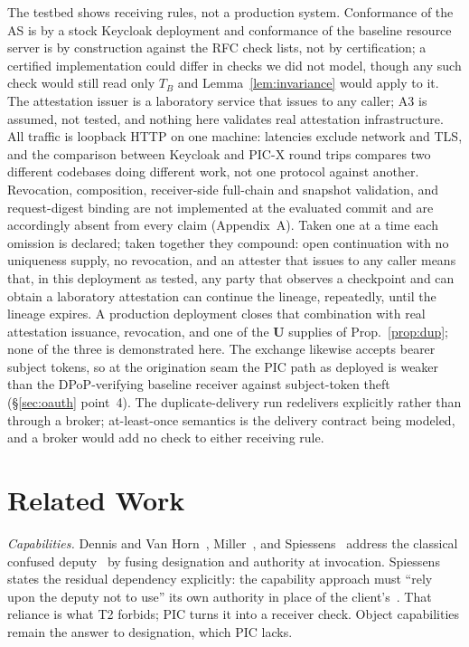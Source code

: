 \documentclass[conference]{IEEEtran}
\begin{document}
The testbed shows receiving rules, not a production system. Conformance of the AS is by a stock Keycloak deployment and conformance of the baseline resource server is by construction against the RFC check lists, not by certification; a certified implementation could differ in checks we did not model, though any such check would still read only $T_B$ and Lemma~\ref{lem:invariance} would apply to it. The attestation issuer is a laboratory service that issues to any caller; A3 is assumed, not tested, and nothing here validates real attestation infrastructure. All traffic is loopback HTTP on one machine: latencies exclude network and TLS, and the comparison between Keycloak and PIC-X round trips compares two different codebases doing different work, not one protocol against another. Revocation, composition, receiver-side full-chain and snapshot validation, and request-digest binding are not implemented at the evaluated commit and are accordingly absent from every claim (Appendix~A). Taken one at a time each omission is declared; taken together they compound: open continuation with no uniqueness supply, no revocation, and an attester that issues to any caller means that, in this deployment as tested, any party that observes a checkpoint and can obtain a laboratory attestation can continue the lineage, repeatedly, until the lineage expires. A production deployment closes that combination with real attestation issuance, revocation, and one of the $\mathbf{U}$ supplies of Prop.~\ref{prop:dup}; none of the three is demonstrated here. The exchange likewise accepts bearer subject tokens, so at the origination seam the PIC path as deployed is weaker than the DPoP-verifying baseline receiver against subject-token theft (\S\ref{sec:oauth} point~4). The duplicate-delivery run redelivers explicitly rather than through a broker; at-least-once semantics is the delivery contract being modeled, and a broker would add no check to either receiving rule.

\section{Related Work}\label{sec:related}

\emph{Capabilities.} Dennis and Van Horn~\cite{dennis1966}, Miller~\cite{miller2003,miller2006}, and Spiessens~\cite{spiessens2007} address the classical confused deputy~\cite{hardy1988} by fusing designation and authority at invocation. Spiessens states the residual dependency explicitly: the capability approach must ``rely upon the deputy not to use'' its own authority in place of the client's~\cite[p.~189]{spiessens2007}. That reliance is what T2 forbids; PIC turns it into a receiver check. Object capabilities remain the answer to designation, which PIC lacks.
\end{document}

